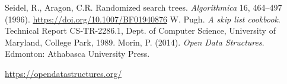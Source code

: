 \documentclass[12pt,english,]{article}
\begin{document}
\newpage
\begin{thebibliography}{9}
Seidel, R., Aragon, C.R. Randomized search trees. \emph{Algorithmica} 16, 464–497 (1996). \url{https://doi.org/10.1007/BF01940876}
W. Pugh. \emph{A skip list cookbook}. Technical Report CS-TR-2286.1, Dept. of Computer
Science, University of Maryland, College Park, 1989.
Morin, P. (2014). \emph{Open Data Structures}. Edmonton: Athabasca University Press.
\vspace{-1.5mm}

\url{https://opendatastructures.org/}

\end{thebibliography}
\end{document}

